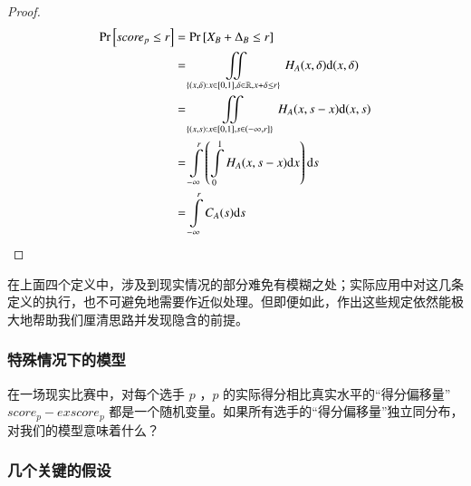             \begin{proof}
                \begin{align}
                    \mathrm{Pr}\left[\textit{score}_p\leq r\right]
                    &=\mathrm{Pr}\left[X_B+\Delta_B\leq r\right] \notag \\
                    &=\iint\limits_{\left\{(x,\delta):x\in\left[0,1\right],\delta\in\mathbb{R},x+\delta\leq r\right\}}H_A(x,\delta)\mathrm{d}(x,\delta) \notag \\
                    &=\iint\limits_{\left\{(x,s):x\in\left[0,1\right],s\in\left(-\infty,r\right]\right\}}H_A(x,s-x)\mathrm{d}(x,s) \notag \\
                    &=\int\limits_{-\infty}^r\left(\int\limits_0^1 H_A(x,s-x)\mathrm{d}x\right)\mathrm{d}s \notag \\
                    &=\int\limits_{-\infty}^r C_A(s)\mathrm{d}s \notag 
                \end{align}
            \end{proof}

            在上面四个定义中，涉及到现实情况的部分难免有模糊之处；实际应用中对这几条定义的执行，也不可避免地需要作近似处理。但即便如此，作出这些规定依然能极大地帮助我们厘清思路并发现隐含的前提。

        \subsubsection{特殊情况下的模型}

            在一场现实比赛中，对每个选手 $p$ ，$p$ 的实际得分相比真实水平的“得分偏移量” $\textit{score}_p-\textit{exscore}_p$ 都是一个随机变量。如果所有选手的“得分偏移量”独立同分布，对我们的模型意味着什么？

        \subsubsection{几个关键的假设}

